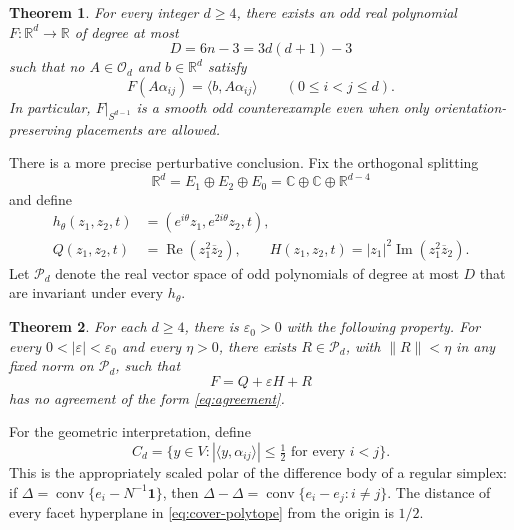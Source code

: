 \documentclass[11pt,reqno]{amsart}
\newtheorem{theorem}{Theorem}[section]
\theoremstyle{definition}
\theoremstyle{remark}
\numberwithin{equation}{section}
\newcommand{\R}{\mathbb R}
\newcommand{\C}{\mathbb C}
\newcommand{\one}{\mathbf 1}
\newcommand{\eps}{\varepsilon}
\newcommand{\Orth}{\mathcal O_d}
\newcommand{\Pol}{\mathcal P_d}
\newcommand{\ip}[2]{\langle #1,#2\rangle}
\newcommand{\norm}[1]{\lVert #1\rVert}
\DeclareMathOperator{\RePart}{Re}
\DeclareMathOperator{\ImPart}{Im}
\begin{document}
\begin{theorem}\label{thm:main}
For every integer $d\geq4$, there exists an odd real polynomial
$F:\R^d\to\R$ of degree at most
\begin{equation}\label{eq:degree-bound}
 D=6n-3=3d(d+1)-3
\end{equation}
such that no $A\in\Orth$ and $b\in\R^d$ satisfy
\begin{equation}\label{eq:agreement}
 F(A\alpha_{ij})=\ip{b}{A\alpha_{ij}}
 \qquad(0\leq i<j\leq d).
\end{equation}
In particular, $F|_{S^{d-1}}$ is a smooth odd counterexample even when
only orientation-preserving placements are allowed.
\end{theorem}

There is a more precise perturbative conclusion. Fix the orthogonal
splitting
\begin{equation}\label{eq:splitting}
 \R^d=E_1\oplus E_2\oplus E_0
      =\C\oplus\C\oplus\R^{d-4}
\end{equation}
and define
\begin{align}
 h_\theta(z_1,z_2,t)&=(e^{i\theta}z_1,e^{2i\theta}z_2,t),
       \label{eq:circle}\\
 Q(z_1,z_2,t)&=\RePart(z_1^2\overline z_2),\qquad
 H(z_1,z_2,t)=|z_1|^2\ImPart(z_1^2\overline z_2).
       \label{eq:seed}
\end{align}
Let $\Pol$ denote the real vector space of odd polynomials of degree
at most $D$ that are invariant under every $h_\theta$.

\begin{theorem}\label{thm:perturbative}
For each $d\geq4$, there is $\eps_0>0$ with the following property.
For every $0<|\eps|<\eps_0$ and every $\eta>0$, there exists
$R\in\Pol$, with $\norm R<\eta$ in any fixed norm on $\Pol$, such that
\[
 F=Q+\eps H+R
\]
has no agreement of the form \eqref{eq:agreement}.
\end{theorem}

For the geometric interpretation, define
\begin{equation}\label{eq:cover-polytope}
 C_d=\{y\in V:|\ip{y}{\alpha_{ij}}|\leq\tfrac12
                 \text{ for every }i<j\}.
\end{equation}
This is the appropriately scaled polar of the difference body of a
regular simplex: if $\Delta=\operatorname{conv}\{e_i-N^{-1}\one\}$,
then $\Delta-\Delta=\operatorname{conv}\{e_i-e_j:i\ne j\}$.
The distance of every facet hyperplane in \eqref{eq:cover-polytope}
from the origin is $1/2$.
\end{document}
